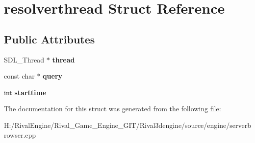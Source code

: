 \hypertarget{structresolverthread}{}\section{resolverthread Struct Reference}
\label{structresolverthread}
\subsection*{Public Attributes}
\begin{DoxyCompactItemize}
\item 
\mbox{\label{structresolverthread_aff55e775567927492cb097e89409e981}} 
S\+D\+L\+\_\+\+Thread $\ast$ {\bfseries thread}
\item 
\mbox{\label{structresolverthread_a7d0597c05d36dd9724cbc3eefe5318b0}} 
const char $\ast$ {\bfseries query}
\item 
\mbox{\label{structresolverthread_af1fcb6334a35792717dea31389dd2bc4}} 
int {\bfseries starttime}
\end{DoxyCompactItemize}


The documentation for this struct was generated from the following file\+:\begin{DoxyCompactItemize}
\item 
H\+:/\+Rival\+Engine/\+Rival\+\_\+\+Game\+\_\+\+Engine\+\_\+\+G\+I\+T/\+Rival3dengine/source/engine/serverbrowser.\+cpp\end{DoxyCompactItemize}
